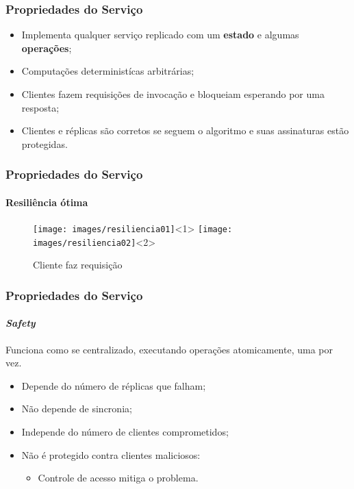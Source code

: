 \documentclass{beamer}
\begin{document}
\begin{frame}
  \frametitle{Propriedades do Serviço}

  \begin{itemize}
    \item
      Implementa qualquer serviço replicado com um \textbf{estado} e algumas \textbf{operações};

    \item
      Computações deterministícas arbitrárias;

    \item
      Clientes fazem requisições de invocação e bloqueiam esperando por uma resposta;

    \item
      Clientes e réplicas são corretos se seguem o algoritmo e suas assinaturas estão protegidas.
  \end{itemize}
\end{frame}

\begin{frame}
  \frametitle{Propriedades do Serviço}
  \framesubtitle{Resiliência ótima}

  \begin{figure}
    \texttt{[image: images/resiliencia01]}<1>
    \texttt{[image: images/resiliencia02]}<2>
    \caption{Cliente faz requisição}
  \end{figure}

\end{frame}

\begin{frame}
  \frametitle{Propriedades do Serviço}
  \framesubtitle{\textit{Safety}}

  Funciona como se centralizado, executando operações atomicamente, uma por vez.
  \begin{itemize}
    \item
      Depende do número de réplicas que falham;

    \item
      Não depende de sincronia;

    \item
      Independe do número de clientes comprometidos;

    \item
      Não é protegido contra clientes maliciosos:
      \begin{itemize}
        \item
          Controle de acesso mitiga o problema.
      \end{itemize}
  \end{itemize}
\end{frame}
\end{document}
